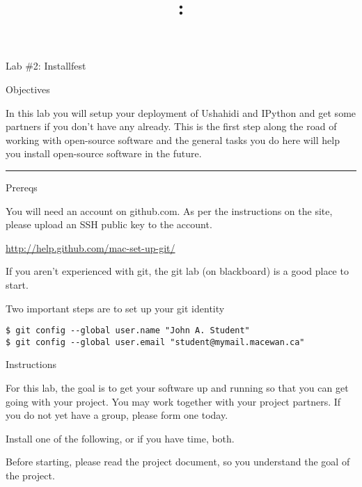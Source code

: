 \documentclass[letterpaper]{article}
\title{\course{}: \activity{}}
\date{}
\newcommand{\activity}{Lab \#2}
\newcommand{\horizrule}{\noindent\rule{\linewidth}{0.15mm}}
\begin{document}
\reversemarginpar

\vspace{0.5cm}

\begin{center}
  \Large{\activity{}: Installfest}
\end{center}

\vspace{0.5cm}

\begin{center}
  \large{Objectives}
\end{center}

In this lab you will setup your deployment of Ushahidi and IPython and get
some partners if you don't have any already.  This is the first step along the road
of working with open-source software and the general tasks you do here will help you
install open-source software in the future.
\vspace{3mm}\\
\horizrule

\begin{center}
  \large{Prereqs}
\end{center}

You will need an account on github.com.  As per the instructions on the site,
please upload an SSH public key to the account.

\url{http://help.github.com/mac-set-up-git/}

If you aren't experienced with git, the git lab (on blackboard) is a good place
to start.

Two important steps are to set up your git identity

\begin{verbatim}
$ git config --global user.name "John A. Student"
$ git config --global user.email "student@mymail.macewan.ca"
\end{verbatim}

\begin{center}
  \large{Instructions}
\end{center}

For this lab, the goal is to get your software up and running so that you can
get going with your project.  You may work together with your project partners.
If you do not yet have a group, please form one today.

Install one of the following, or if you have time, both.

Before starting, please read the project document, so you understand the goal
of the project.
\end{document}
